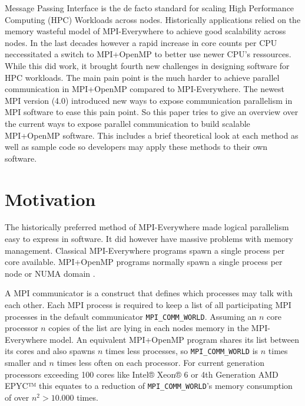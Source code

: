 \documentclass[sigconf]{acmart}
\begin{document}
Message Passing Interface is the de facto standard for scaling High Performance Computing (HPC) Workloads across nodes.
Historically applications relied on the memory wasteful model of MPI-Everywhere to achieve good scalability across nodes.
In the last decades however a rapid increase in core counts per CPU neccessitated a switch to MPI+OpenMP to better use newer CPU's ressources.
While this did work, it brought fourth new challenges in designing software for HPC workloads.
The main pain point is the much harder to achieve parallel communication in MPI+OpenMP compared to MPI-Everywhere.
The newest MPI version (4.0) introduced new ways to expose communication parallelism in MPI software to ease this pain point.
So this paper tries to give an overview over the current ways to expose parallel communication to build scalable MPI+OpenMP software.
This includes a brief theoretical look at each method as well as sample code so developers may apply these methods to their own software.




\section{Motivation}
The historically preferred method of MPI-Everywhere made logical parallelism easy to express in software.
It did however have massive problems with memory management.
Classical MPI-Everywhere programs spawn a single process per core available.
MPI+OpenMP programs normally spawn a single process per node or NUMA domain \cite{zambreLessonsLearned2022}.

A MPI communicator is a construct that defines which processes may talk with each other.
Each MPI process is required to keep a list of all participating MPI processes in the default communicator \verb|MPI_COMM_WORLD|.
Assuming an $n$ core processor $n$ copies of the list are lying in each nodes memory in the MPI-Everywhere model.
An equivalent MPI+OpenMP program shares its list between its cores and also spawns $n$ times less processes, so \verb|MPI_COMM_WORLD| is $n$ times smaller and $n$ times less often on each processor.
For current generation processors exceeding 100 cores like Intel® Xeon® 6 \cite{intelXeon6} or 4th Generation AMD EPYC™ \cite{amd4thGenEpyc} this equates to a reduction of \verb|MPI_COMM_WORLD|'s memory consumption of over $n^2 > 10.000$ times.
\end{document}
